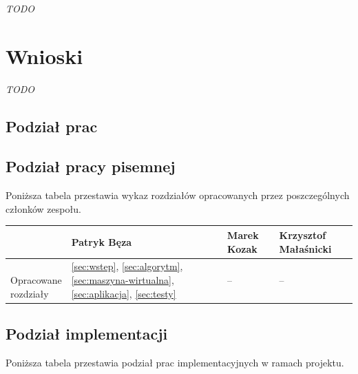 \documentclass[a4paper,titlepage]{article}
\theoremstyle{break}
\numberwithin{equation}{subsection}
\begin{document}
\emph{TODO}


\section{Wnioski}

\emph{TODO}


\newpage

\begin{appendices}

\section{Podział prac}
\subsection{Podział pracy pisemnej}

Poniższa tabela przestawia wykaz rozdziałów opracowanych przez poszczególnych członków zespołu.

\begin{table}[H]
\center
\begin{tabular}{p{2.5cm}|p{4cm}|p{4cm}|p{4cm}}
& Patryk Bęza & Marek Kozak & Krzysztof Małaśnicki \\\hline\hline
\parbox{3cm}{\ \\Opracowane \\rozdziały} & \ref{sec:wstep}, \ref{sec:algorytm}, \ref{sec:maszyna-wirtualna}, \ref{sec:aplikacja}, \ref{sec:testy} & -- & --\\
\end{tabular}
\end{table}

\subsection{Podział implementacji}

Poniższa tabela przestawia podział prac implementacyjnych w ramach projektu.


\end{appendices}
\end{document}
